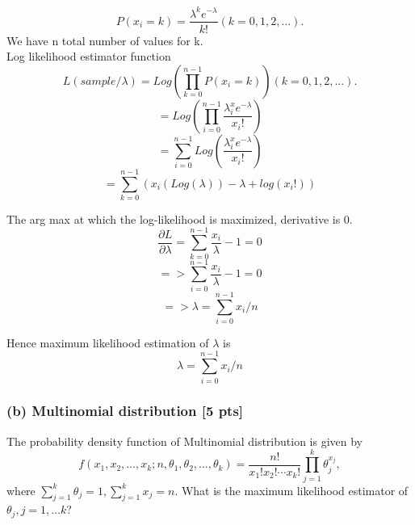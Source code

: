 \documentclass[twoside,10pt]{article}
\begin{document}
\begin{equation} \nonumber
P(x_i = k) = \frac{\lambda^k e^{-\lambda}}{k!} (k = 0, 1, 2, ...).
\end{equation}
We have n total number of values for k.\\
Log likelihood estimator function 
\begin{equation} \nonumber
L(sample/\lambda) = Log(\prod_{k = 0}^{n-1}{P(x_i = k)}) (k = 0, 1, 2, ...).
\end{equation}
\begin{equation} \nonumber
= Log(\prod_{i = 0}^{n-1}{\frac{\lambda^x_i e^{-\lambda}}{x_i!}}) 
\end{equation}
\begin{equation} \nonumber
= \sum_{i = 0}^{n-1} { Log({\frac{\lambda^x_i e^{-\lambda}}{x_i!}}) }
\end{equation}
\begin{equation} \nonumber
= \sum_{k = 0}^{n-1} { (x_i(Log(\lambda))-\lambda+log(x_i!) )}
\end{equation}

The arg max at which the log-likelihood is maximized, derivative is 0. 
\begin{equation} \nonumber
\frac{\partial L}{\partial \lambda}= \sum_{k = 0}^{n-1} { \frac{x_i}{\lambda}-1 } = 0
\end{equation}
\begin{equation} \nonumber
=> \sum_{i = 0}^{n-1} { \frac{x_i}{\lambda}-1 } = 0
\end{equation}
\begin{equation} \nonumber
=> \lambda = \sum_{i = 0}^{n-1} { x_i }/n 
\end{equation}

Hence maximum likelihood estimation of $\lambda$ is 
\begin{equation} \nonumber
\boxed{\lambda = \sum_{i = 0}^{n-1} { x_i }/n }
\end{equation}


\vspace{1cm}
\subsubsection*{(b) Multinomial distribution [5 pts]}
The probability density function of Multinomial distribution is given by 
$$f(x_1,x_2,\dots,x_k;n,\theta_1,\theta_2,\dots,\theta_k)=\frac{n!}{x_1!x_2!\cdots x_k!}\prod_{j=1}^{k}\theta_j^{x_j},$$
where $\sum_{j=1}^k\theta_j=1,\sum_{j=1}^k x_j=n$. What is the maximum likelihood estimator of $\theta_j, j=1,\dots k$?\\
  
\end{document}
